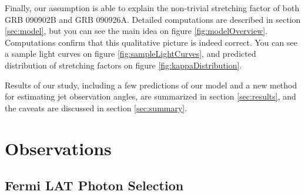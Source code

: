 \documentclass{article}
\begin{document}
	Finally, our assumption is able to explain the non-trivial stretching factor of both GRB 090902B and GRB 090926A.
	Detailed computations are described in section \ref{sec:model}, but you can see the main idea on figure \ref{fig:modelOverview}.
	Computations confirm that this qualitative picture is indeed correct.
	You can see a sample light curves on figure \ref{fig:sampleLightCurves}, and predicted distribution of stretching factors on figure \ref{fig:kappaDistribution}.

	Results of our study, including a few predictions of our model and a new method for estimating jet observation angles, are summarized in section \ref{sec:results}, and the caveats are discussed in section \ref{sec:summary}.

\section{Observations}
\label{sec:observations}

\subsection{Fermi LAT Photon Selection}
\label{sec:photonSelection}
\end{document}
